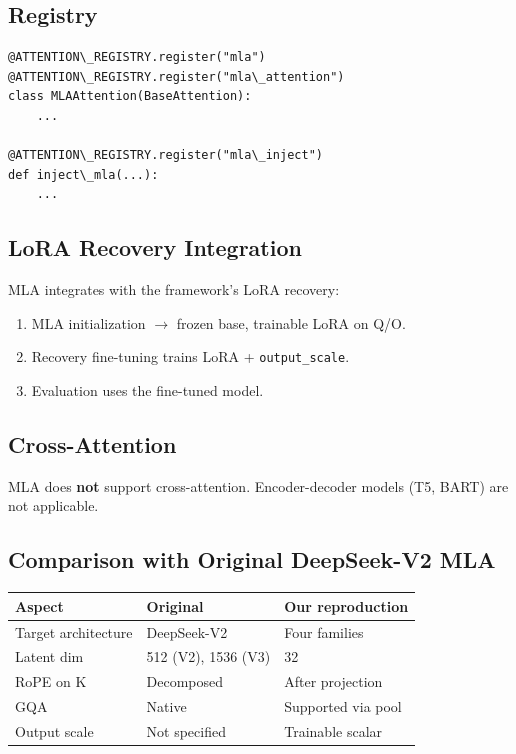 \subsection{Registry}

\begin{lstlisting}
@ATTENTION\_REGISTRY.register("mla")
@ATTENTION\_REGISTRY.register("mla\_attention")
class MLAAttention(BaseAttention):
    ...

@ATTENTION\_REGISTRY.register("mla\_inject")
def inject\_mla(...):
    ...
\end{lstlisting}

\subsection{LoRA Recovery Integration}

MLA integrates with the framework's LoRA recovery:

\begin{enumerate}
\item MLA initialization $\to$ frozen base, trainable LoRA on Q/O.
\item Recovery fine-tuning trains LoRA + \texttt{output\_scale}.
\item Evaluation uses the fine-tuned model.

\end{enumerate}
\subsection{Cross-Attention}

MLA does \textbf{not} support cross-attention. Encoder-decoder models (T5, BART) 
are not applicable.

\subsection{Comparison with Original DeepSeek-V2 MLA}

\begin{table}[H]
\centering
\small
\begin{tabular}{lll}
\toprule
\textbf{Aspect} & \textbf{Original} & \textbf{Our reproduction} \\
\midrule
Target architecture & DeepSeek-V2 & Four families \\
Latent dim & 512 (V2), 1536 (V3) & 32 \\
RoPE on K & Decomposed & After projection \\
GQA & Native & Supported via pool \\
Output scale & Not specified & Trainable scalar \\
\bottomrule
\end{tabular}
\end{table}

